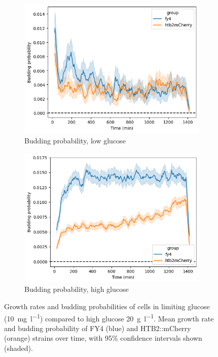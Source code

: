 \begin{figure}
  \begin{subfigure}[htpb]{0.45\textwidth}
   \centering
   \includegraphics[width=\textwidth]{allstrains_31492_budprob}
   \caption{
     Budding probability, low glucose
   }
   \label{fig:biology-lowglc-budprob}
  \end{subfigure}%
  \begin{subfigure}[htpb]{0.45\textwidth}
   \centering
   \includegraphics[width=\textwidth]{allstrains_26643_budprob}
   \caption{
     Budding probability, high glucose
   }
   \label{fig:biology-highglc-gr}
  \end{subfigure}

  \caption{
    Growth rates and budding probabilities of cells in limiting glucose (\SI{10}{\milli\gram~\litre^{-1}}) compared to high glucose \SI{20}{\gram~\litre^{-1}}.
    Mean growth rate and budding probability of FY4 (blue) and HTB2::mCherry (orange) strains over time, with 95\% confidence intervals shown (shaded).
  }
  \label{fig:biology-lowglc-gr-budprob}
\end{figure}

